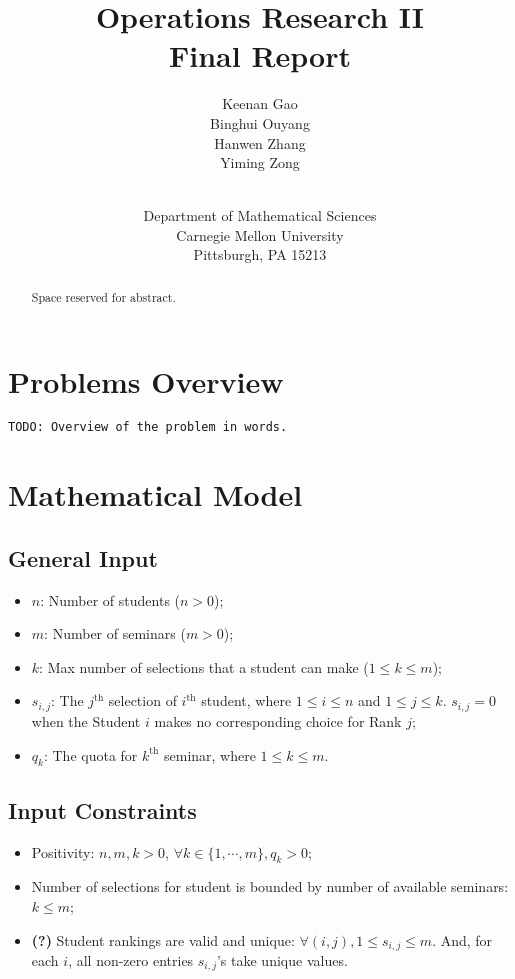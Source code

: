 \documentclass{article} %
\title{Operations Research II\\Final Report}
\author{
Keenan Gao \\
\And
Binghui Ouyang \\
\And
Hanwen Zhang \\
\And
Yiming Zong\\ \\
\and Department of Mathematical Sciences \\ Carnegie Mellon University \\ Pittsburgh, PA 15213
}
\begin{document}
\maketitle

\begin{abstract}
    Space reserved for abstract.
\end{abstract}

%
%
\section{Problems Overview}
    \texttt{TODO: Overview of the problem in words.}


\section{Mathematical Model}
\subsection{General Input}
\begin{itemize}
    \item $n$: Number of students ($n > 0$);
    \item $m$: Number of seminars ($m > 0$);
    \item $k$: Max number of selections that a student can make ($1 \leq k \leq m$);
    \item $s_{i,j}$: The $j^{\text{th}}$ selection of $i^{\text{th}}$ student, where $1\leq i \leq n$ and $1\leq j \leq k$. $s_{i,j}=0$ when the Student $i$ makes no corresponding choice for Rank $j$;
    \item $q_k$: The quota for $k^{\text{th}}$ seminar, where $1\leq k \leq m$.
\end{itemize}

\subsection{Input Constraints}
\begin{itemize}
    \item Positivity: $n,m,k>0$, $\forall k\in\{1,\cdots,m\}, q_k>0$;
    \item Number of selections for student is bounded by number of available seminars: $k \leq m$;
    \item \textbf{(?)} Student rankings are valid and unique: $\forall (i,j), 1\leq s_{i,j} \leq m$. And, for each $i$, all non-zero entries $s_{i,j}$'s take unique values.
\end{itemize}
\end{document}
